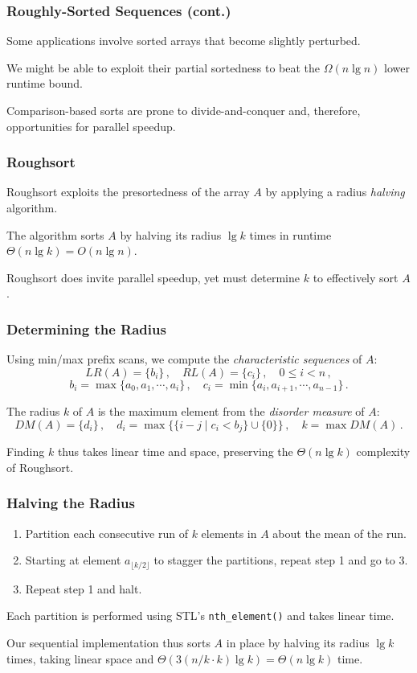 \documentclass[10pt, xcolor={dvipsnames}, aspectratio=169]{beamer}
\begin{document}
\begin{frame}
\frametitle{Roughly-Sorted Sequences (cont.)}
Some applications involve sorted arrays that become slightly perturbed. \newline

We might be able to exploit their partial sortedness to beat the $\Omega(n \lg n)$ lower runtime bound. \newline

Comparison-based sorts are prone to divide-and-conquer and, therefore, opportunities for parallel speedup.
\end{frame}

\begin{frame}
\frametitle{Roughsort}
Roughsort exploits the presortedness of the array $A$ by applying a radius \textit{halving} algorithm. \newline

The algorithm sorts $A$ by halving its radius $\lg k$ times in runtime $\Theta(n \lg k) = O(n \lg n)$. \newline

Roughsort does invite parallel speedup, yet must determine $k$ to effectively sort $A$.
\end{frame}

\begin{frame}
\frametitle{Determining the Radius}
Using min/max prefix scans, we compute the \textit{characteristic sequences} of $A$:
$$LR(A) = \{b_i\}\,,\quad RL(A) = \{c_i\}\,,\quad 0 \leq i < n\,,$$
$$b_i = \max\{a_0, a_1, \cdots, a_i\}\,,\quad c_i = \min\{a_i, a_{i+1}, \cdots, a_{n-1}\}\,.$$

The radius $k$ of $A$ is the maximum element from the \textit{disorder measure} of $A$:
$$DM(A) = \{d_i\}\,,\quad d_i = \max\big\{\{i - j \mid c_i < b_j\} \cup \{0\} \big\}\,,\quad k = \max DM(A) \,.$$

Finding $k$ thus takes linear time and space, preserving the $\Theta(n \lg k)$ complexity of Roughsort.
\end{frame}

\begin{frame}
\frametitle{Halving the Radius}
\begin{enumerate}
\item Partition each consecutive run of $k$ elements in $A$ about the mean of the run.
\item Starting at element $a_{\lfloor k/2 \rfloor}$ to stagger the partitions, repeat step 1 and go to 3.
\item Repeat step 1 and halt.
\end{enumerate}

Each partition is performed using STL's \texttt{nth_element()} and takes linear time. \newline

Our sequential implementation thus sorts $A$ in place by halving its radius $\lg k$ times, taking linear space and
  $\Theta(3(n/k \cdot k) \lg k) = \Theta(n \lg k)$ time.
\end{frame}
\end{document}
